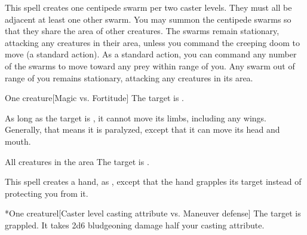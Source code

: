 \spellrng{\rngmed}
\spelldur{\durmed}
\spellline
\spelleffect This spell creates one centipede swarm per two caster levels. They must all be adjacent at least one other swarm. You may summon the centipede swarms so that they share the area of other creatures. The swarms remain stationary, attacking any creatures in their area, unless you command the creeping doom to move (a standard action). As a standard action, you can command any number of the swarms to move toward any prey within range of you. Any swarm out of range of you remains stationary, attacking any creatures in its area.

\spellrng{\rngmed}
\spelldur{\durshort}
\begin{spelltarget}{One creature}[Magic vs. Fortitude]
    \spellsuccess The target is \staggered.
    
     As long as the target is \bloodied, it cannot move its limbs, including any wings. Generally, that means it is paralyzed, except that it can move its head and mouth.
\end{spelltarget}

\spelldur{\durmed}
\begin{spelltargets}{All creatures in the area}
    The target is \vulnerable.
\end{spelltargets}

\spellrng{\rngmed}
\spelldur{\durshort \dismissable}
\spellline
\spelleffect This spell creates a hand, as , except that the hand grapples its target instead of protecting you from it.
\begin{spelltarget}*{One creature}l[Caster level \add casting attribute vs. Maneuver defense]
    \spellsuccess The target is grappled. It takes 2d6 bludgeoning damage \add half your casting attribute.
\end{spelltarget}

